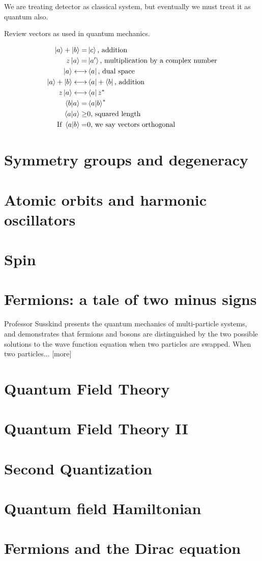 \documentclass[]{article}
\begin{document}
We are treating detector as classical system, but eventually we must treat it as quantum also.

Review vectors as used in quantum mechanics.

\begin{align*}
\ket{a}+\ket{b}=&\ket{c}\text{, addition}\\
z\ket{a} =& \ket{a^{\prime}} \text{, multiplication by a complex number}\\
\ket{a} \longleftrightarrow & \bra{a} \text {, dual space}\\
\ket{a}+\ket{b}\longleftrightarrow & \bra{a} + \bra{b}\text{, addition}\\
z\ket{a} \longleftrightarrow & \bra{a}z^*\\
\braket{b|a} =& \braket{a|b}^*\\
\braket{a|a} \ge& 0 \text{, squared length}\\
\text{If }\braket{a|b}=& 0 \text{, we say vectors orthogonal}
\end{align*}

\section{Symmetry groups and degeneracy}

\section{Atomic orbits and harmonic oscillators}

\section{Spin}

\section{Fermions: a tale of two minus signs}

	Professor Susskind presents the quantum mechanics of multi-particle systems, and demonstrates that fermions and bosons are distinguished by the two possible solutions to the wave function equation when two particles are swapped.  When two particles... [more] 

\section{Quantum Field Theory}

\section{Quantum Field Theory II}

\section {Second Quantization}

\section{Quantum field Hamiltonian}

\section{Fermions and the Dirac equation}
\end{document}
